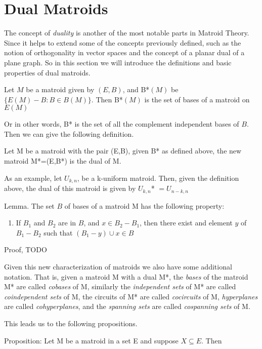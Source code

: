 \section{Dual Matroids}
The concept of \textit{duality} is another of the most notable parts in Matroid Theory. Since it helps to extend some of the concepts previously defined, such as the notion of orthogonality in vector spaces and the concept of a planar dual of a plane graph. So in this section we will introduce the definitions and basic properties of dual matroids.

\begin{theorem}
    Let $M$ be a matroid given by $(E,B)$, and B*$(M)$ be $\{E(M) - B:B\in B(M)\}$. Then B*$(M)$ is the set of bases of a matroid on $E(M)$
\end{theorem}

Or in other words, B* is the set of all the complement independent bases of $B$. Then we can give the following definition.

\begin{defn}
    Let M be a matroid with the pair (E,B), given B* as defined above, the new matroid M*=(E,B*) is the dual of M.
\end{defn}

As an example, let $U_{k,n}$, be a k-uniform matroid. Then, given the definition above, the dual of this matroid is given by $U_{k,n}$* $= U_{n-k,n}$

Lemma. The set $B$ of bases of a matroid M has the following property:
\begin{enumerate}
    \item If $B_1$ and $B_2$ are in $B$, and $x\in B_2 - B_1$, then there exist and element $y$ of $B_1 - B_2$ such that $(B_1 - y) \cup x \in B$ 
\end{enumerate}

Proof, TODO


    Given this new characterization of matroids we also have some additional notation. That is, given a matroid M with a dual M*, the \textit{bases} of the matroid M* are called \textit{cobases} of M, similarly the \textit{independent sets} of M* are called \textit{coindependent sets} of M, the circuits of M* are called \textit{cocircuits} of M, \textit{hyperplanes} are called \textit{cohyperplanes}, and the \textit{spanning sets} are called \textit{cospanning sets} of M.

This leads us to the following propositions.

Proposition:
Let M be a matroid in a set E and suppose $X \subseteq E$. Then

